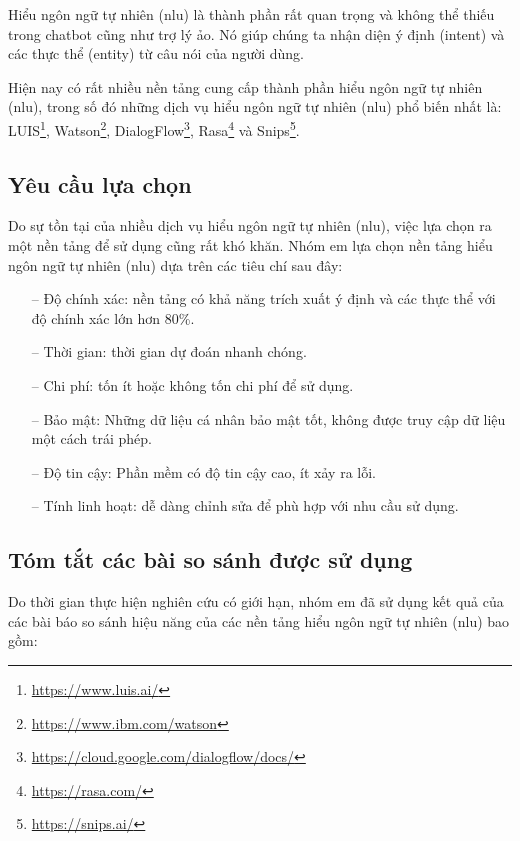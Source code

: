 Hiểu ngôn ngữ tự nhiên (\ac{nlu}) là thành phần rất quan trọng và không thể thiếu trong chatbot cũng như trợ lý ảo. Nó giúp chúng ta nhận diện ý định (intent) và các thực thể (entity) từ câu nói của người dùng.

Hiện nay có rất nhiều nền tảng cung cấp thành phần hiểu ngôn ngữ tự nhiên (\ac{nlu}), trong số đó những dịch vụ hiểu ngôn ngữ tự nhiên (\ac{nlu}) phổ biến nhất là: LUIS\footnote{\url{https://www.luis.ai/}}, Watson\footnote{\url{https://www.ibm.com/watson}}, DialogFlow\footnote{\url{https://cloud.google.com/dialogflow/docs/}}, Rasa\footnote{\url{https://rasa.com/}} và Snips\footnote{\url{https://snips.ai/}}.


\subsection{Yêu cầu lựa chọn}
Do sự tồn tại của nhiều dịch vụ hiểu ngôn ngữ tự nhiên (\ac{nlu}), việc lựa chọn ra một nền tảng để sử dụng cũng rất khó khăn. Nhóm em lựa chọn nền tảng hiểu ngôn ngữ tự nhiên (\ac{nlu}) dựa trên các tiêu chí sau đây:

\begin{itemize}
  \item[--] Độ chính xác: nền tảng có khả năng trích xuất ý định và các thực thể với độ chính xác lớn hơn 80\%.
  \item[--] Thời gian: thời gian dự đoán nhanh chóng.
    \item[--] Chi phí:  tốn ít hoặc không tốn chi phí để sử dụng.
    \item[--] Bảo mật: Những dữ liệu cá nhân bảo mật tốt, không được truy cập dữ liệu một cách trái phép.
    \item[--] Độ tin cậy: Phần mềm có độ tin cậy cao, ít xảy ra lỗi.
    \item[--] Tính linh hoạt: dễ dàng chỉnh sửa để phù hợp với nhu cầu sử dụng. 
\end{itemize}

\subsection{Tóm tắt các bài so sánh được sử dụng}

Do thời gian thực hiện nghiên cứu có giới hạn, nhóm em đã sử dụng kết quả của các bài báo so sánh hiệu năng của các nền tảng hiểu ngôn ngữ tự nhiên (\ac{nlu}) bao gồm:

